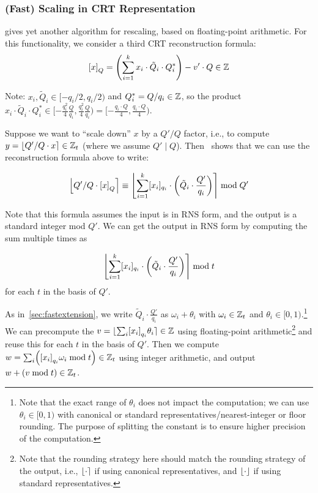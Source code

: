 \documentclass[../../fheimpl.tex]{subfiles}
\begin{document}
\subsubsection{(Fast) Scaling in CRT Representation}
\label{sec:fastscaling}
\cite{cryptoeprint:2018/117} gives yet another algorithm for rescaling, based on floating-point arithmetic. 
For this functionality, we consider a third CRT reconstruction formula:
\[\bracks*{x}_Q=\parens*{\sum_{i=1}^k x_i\cdot\tilde{Q}_i\cdot Q_i^*}-v'\cdot Q\in\Z\]

Note: $x_i, \tilde{Q}_i \in [-q_i/2, q_i/2)$ and $Q_i^* = Q/q_i \in \Z$, so the product $x_i\cdot\tilde{Q}_i\cdot Q_i^* \in [-\frac{q_i^2}{4}\frac{Q}{q_i}, \frac{q_i^2}{4}\frac{Q}{q_i})= [-\frac{q_i\cdot Q}{4}, \frac{q_i\cdot Q}{4})$. 

Suppose we want to ``scale down'' $x$ by a $Q'/Q$ factor, i.e., to compute $y=\round{Q'/Q\cdot x}\in\Z_t$ (where we assume $Q' \mid Q$). Then~\cite{cryptoeprint:2018/117} shows that we can use the reconstruction formula above to write: 

\[\round*{Q'/Q\cdot \bracks*{x}_Q} \equiv \round*{\sum_{i=1}^k \bracks{x_i}_{q_i}\cdot\parens*{\tilde{Q}_i\cdot\frac{Q'}{q_i}}} \bmod Q'\]

Note that this formula assumes the input is in RNS form, and the output is a standard integer mod $Q'$. We can get the output in RNS form by computing the sum multiple times as

\[\round*{\sum_{i=1}^k \bracks{x_i}_{q_i}\cdot\parens*{\tilde{Q}_i\cdot\frac{Q'}{q_i}}} \bmod t\]
for each $t$ in the basis of $Q'$.

As in~\cref{sec:fastextension}, we write $\tilde{Q}_i\cdot\frac{Q'}{q_i}$ as $\omega_i+\theta_i$ with $\omega_i\in\Z_t$ and $\theta_i\in[0, 1)$.\footnote{Note that the exact range of $\theta_i$ does not impact the computation; we can use $\theta_i\in[0, 1)$ with canonical or standard representatives/nearest-integer or floor rounding. The purpose of splitting the constant is to ensure higher precision of the computation.} 
We can precompute the $v=\round{\sum_i \bracks*{x_i}_{q_i}\theta_i}\in\Z$ using floating-point arithmetic\footnote{Note that the rounding strategy here should match the rounding strategy of the output, i.e., $\round{\cdot}$ if using canonical representatives, and $\floor{\cdot}$ if using standard representatives.} and reuse this for each $t$ in the basis of $Q'$.
Then we compute $w = \sum_i \parens*{\bracks*{x_i}_{q_i}\omega_i \bmod t}\in\Z_t$ using integer arithmetic, and output $w+(v\bmod t)\in\Z_t$.
\end{document}
